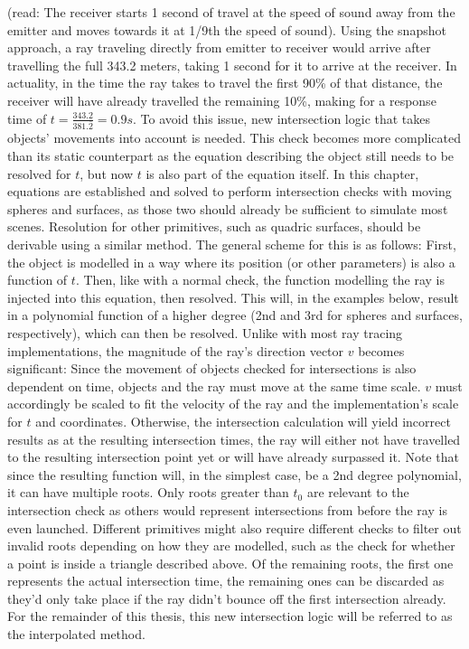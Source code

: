 (read: The receiver starts 1 second of travel at the speed of sound away from the emitter
and moves towards it at 1/9th the speed of sound).
\newline
Using the snapshot approach, a ray traveling directly from emitter to receiver would arrive after travelling the full 343.2 meters,
taking 1 second for it to arrive at the receiver.
In actuality, in the time the ray takes to travel the first 90\% of that distance,
the receiver will have already travelled the remaining 10\%,
making for a response time of \(t = \frac{343.2}{381.\bar{2}} = 0.9s\).
\newline
To avoid this issue, new intersection logic that takes objects' movements into account is needed.
This check becomes more complicated than its static counterpart as the equation describing the object still needs to be resolved for \(t\),
but now \(t\) is also part of the equation itself.
In this chapter, equations are established and solved to perform intersection checks with moving spheres and surfaces,
as those two should already be sufficient to simulate most scenes.
Resolution for other primitives, such as quadric surfaces, should be derivable using a similar method.
\newline
The general scheme for this is as follows:
First, the object is modelled in a way where its position (or other parameters) is also a function of \(t\).
Then, like with a normal check, the function modelling the ray is injected into this equation,
then resolved.
This will, in the examples below, result in a polynomial function of a higher degree
(2nd and 3rd for spheres and surfaces, respectively), which can then be resolved.
\newline
Unlike with most ray tracing implementations, the magnitude of the ray's direction vector \(v\) becomes significant:
Since the movement of objects checked for intersections is also dependent on time,
objects and the ray must move at the same time scale.
\(v\) must accordingly be scaled to fit the velocity of the ray and the implementation's scale for \(t\) and coordinates.
Otherwise, the intersection calculation will yield incorrect results as at the resulting intersection times,
the ray will either not have travelled to the resulting intersection point yet or will have already surpassed it.
\newline
Note that since the resulting function will, in the simplest case, be a 2nd degree polynomial, it can have multiple roots.
Only roots greater than \(t_0\) are relevant to the intersection check as others would represent intersections from before the ray is even launched.
Different primitives might also require different checks to filter out invalid roots depending on how they are modelled,
such as the check for whether a point is inside a triangle described above.
Of the remaining roots, the first one represents the actual intersection time,
the remaining ones can be discarded as they'd only take place if the ray didn't bounce off the first intersection already.
\newline
For the remainder of this thesis, this new intersection logic will be referred to as the interpolated method.

